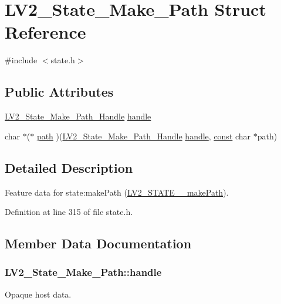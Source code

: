\hypertarget{struct_l_v2___state___make___path}{}\section{L\+V2\+\_\+\+State\+\_\+\+Make\+\_\+\+Path Struct Reference}
\label{struct_l_v2___state___make___path}


{\ttfamily \#include $<$state.\+h$>$}

\subsection*{Public Attributes}
\begin{DoxyCompactItemize}
\item 
\hyperlink{state_8h_a1bb823cc8cc428dc41af2952b5f3d765}{L\+V2\+\_\+\+State\+\_\+\+Make\+\_\+\+Path\+\_\+\+Handle} \hyperlink{struct_l_v2___state___make___path_a4ab3ae3e08f59d6ed2548ce5244f5766}{handle}
\item 
char $\ast$($\ast$ \hyperlink{struct_l_v2___state___make___path_a1a459dc25d020171013bc8826614897e}{path} )(\hyperlink{state_8h_a1bb823cc8cc428dc41af2952b5f3d765}{L\+V2\+\_\+\+State\+\_\+\+Make\+\_\+\+Path\+\_\+\+Handle} \hyperlink{struct_l_v2___state___make___path_a4ab3ae3e08f59d6ed2548ce5244f5766}{handle}, \hyperlink{getopt1_8c_a2c212835823e3c54a8ab6d95c652660e}{const} char $\ast$path)
\end{DoxyCompactItemize}


\subsection{Detailed Description}
Feature data for state\+:make\+Path (\hyperlink{state_8h_ab4d3f5c5795130d37469e0fb5e484d29}{L\+V2\+\_\+\+S\+T\+A\+T\+E\+\_\+\+\_\+make\+Path}). 

Definition at line 315 of file state.\+h.



\subsection{Member Data Documentation}
\subsubsection[{\texorpdfstring{handle}{handle}}]{ L\+V2\+\_\+\+State\+\_\+\+Make\+\_\+\+Path\+::handle}\hypertarget{struct_l_v2___state___make___path_a4ab3ae3e08f59d6ed2548ce5244f5766}{}\label{struct_l_v2___state___make___path_a4ab3ae3e08f59d6ed2548ce5244f5766}
Opaque host data. 

